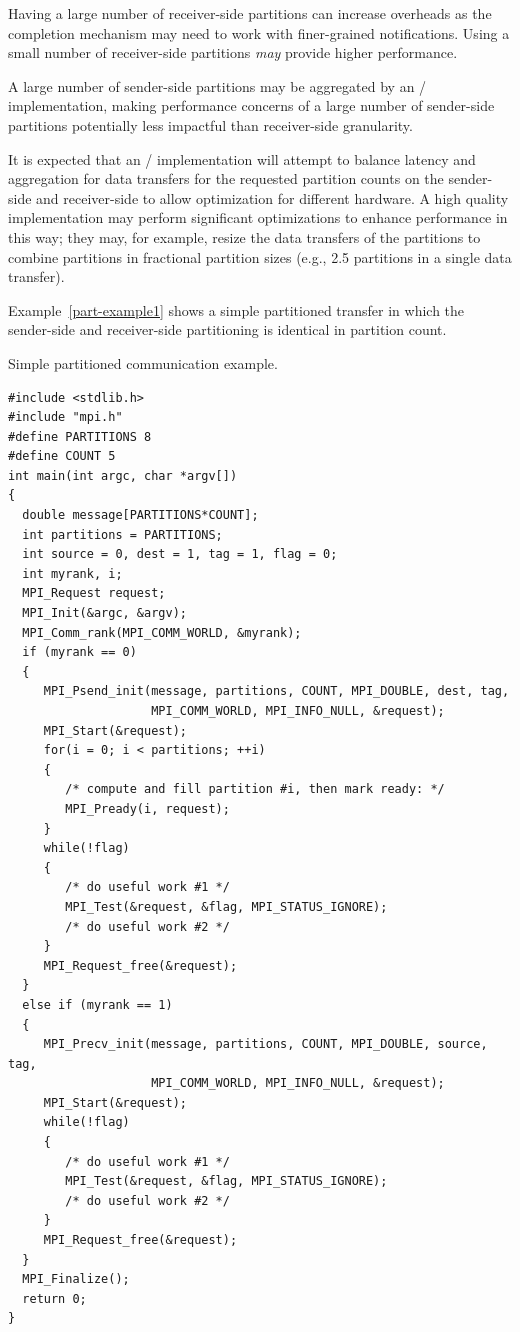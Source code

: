 \begin{users}
Having a large number of receiver-side partitions can increase overheads 
as the completion mechanism may need to work with finer-grained notifications. Using a small
number of receiver-side partitions \emph{may} provide higher performance.

A large number of sender-side partitions may be aggregated by an \MPI/ implementation,
making performance concerns of a large number of sender-side partitions potentially less impactful
than receiver-side granularity. 
\end{users}

\begin{implementors}
It is expected that an \MPI/ implementation will attempt to balance
latency and aggregation for
data transfers for the requested partition counts on the sender-side and receiver-side
to allow optimization for different hardware. A high quality implementation may 
perform significant optimizations to enhance performance in this way; they may, for example,
resize the data transfers of the partitions to combine partitions in fractional
partition sizes (e.g., 2.5 partitions in a single data transfer). 
\end{implementors}

 
Example~\ref{part-example1} shows a simple partitioned transfer
in which the sender-side and receiver-side partitioning is identical in partition count.

\begin{example}
Simple partitioned communication example.
\label{part-example1}%
%
%
\begin{lstlisting}[language={[MPI]C}]
#include <stdlib.h>
#include "mpi.h"
#define PARTITIONS 8
#define COUNT 5
int main(int argc, char *argv[])
{
  double message[PARTITIONS*COUNT];
  int partitions = PARTITIONS;
  int source = 0, dest = 1, tag = 1, flag = 0;
  int myrank, i;
  MPI_Request request;
  MPI_Init(&argc, &argv);
  MPI_Comm_rank(MPI_COMM_WORLD, &myrank);
  if (myrank == 0)
  {
     MPI_Psend_init(message, partitions, COUNT, MPI_DOUBLE, dest, tag,
                    MPI_COMM_WORLD, MPI_INFO_NULL, &request);
     MPI_Start(&request);
     for(i = 0; i < partitions; ++i)
     {
        /* compute and fill partition #i, then mark ready: */
        MPI_Pready(i, request);
     }
     while(!flag)
     {
        /* do useful work #1 */
        MPI_Test(&request, &flag, MPI_STATUS_IGNORE);
        /* do useful work #2 */
     }
     MPI_Request_free(&request);
  }
  else if (myrank == 1)
  {
     MPI_Precv_init(message, partitions, COUNT, MPI_DOUBLE, source, tag,
                    MPI_COMM_WORLD, MPI_INFO_NULL, &request);
     MPI_Start(&request);
     while(!flag)
     {
        /* do useful work #1 */
        MPI_Test(&request, &flag, MPI_STATUS_IGNORE);
        /* do useful work #2 */
     }
     MPI_Request_free(&request);
  }
  MPI_Finalize();
  return 0;
}
\end{lstlisting}
\end{example}


